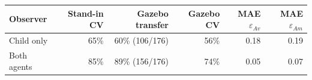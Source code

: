 \begin{tabular}{@{}lrrrrr@{}}
\toprule
Observer & Stand-in CV & Gazebo transfer & Gazebo CV & MAE $\varepsilon_{Av}$ & MAE $\varepsilon_{Am}$ \\
\midrule
Child only & 65\% & 60\% (106/176) & 56\% & 0.18 & 0.19 \\
Both agents & 85\% & 89\% (156/176) & 74\% & 0.05 & 0.07 \\
\bottomrule
\end{tabular}
